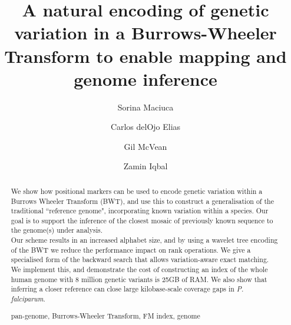 \documentclass[runningheads,a4paper]{llncs}
\newcommand{\keywords}[1]{\par\addvspace\baselineskip
\noindent\keywordname\enspace\ignorespaces#1}
\begin{document}
\mainmatter  %

\title{A natural encoding of genetic variation in a Burrows-Wheeler Transform  to enable mapping and genome inference}


%
%
\author{Sorina Maciuca%
\and Carlos delOjo Elias\and Gil McVean \and Zamin Iqbal}
%



\maketitle


\begin{abstract}
We show how positional markers can be used to encode genetic variation within a Burrows Wheeler Transform (BWT), and use this to construct a generalisation of the traditional ``reference genome", incorporating known variation within a species. Our goal is to support the inference of the closest mosaic of previously known sequence to the genome(s) under analysis.\\ Our scheme results in an increased alphabet size, and by using a wavelet tree encoding of the BWT we reduce the performance impact on rank operations. We give a specialised form of the backward search that allows variation-aware exact matching. We implement this, and demonstrate the cost of constructing an index of the whole human genome with 8 million genetic variants is 25GB of RAM. We also show that inferring a closer reference can close large kilobase-scale coverage gaps in \textit{P. falciparum}.
\keywords{pan-genome, Burrows-Wheeler Transform, FM index, genome}
\end{abstract}
\end{document}
